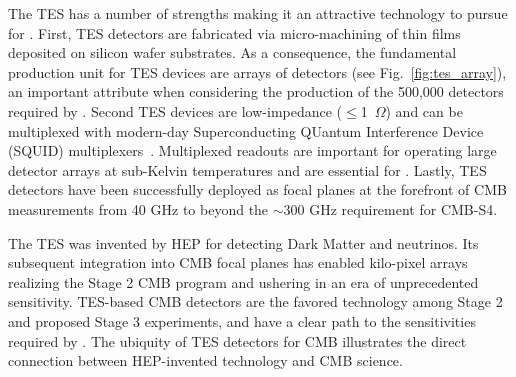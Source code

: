 The TES has a number of strengths making it an attractive technology to
pursue for \cmbexp. First, TES detectors are fabricated via
micro-machining of thin films deposited on silicon wafer
substrates. As a consequence, the fundamental production unit for TES
devices are arrays of detectors (see Fig.~\ref{fig:tes_array}), an
important attribute when considering the production of the 500,000
detectors required by \cmbexp.  Second TES devices are low-impedance
($\le$1~$\Omega$) and can be multiplexed with modern-day
Superconducting QUantum Interference Device (SQUID)
multiplexers~\cite{Lanting:2006aa,Irwin:2002aa,Irwin:2004aa}. Multiplexed readouts are important
for operating large detector arrays at sub-Kelvin temperatures and are
essential for \cmbexp. Lastly, TES detectors have been successfully
deployed as focal planes at the forefront of CMB measurements from 40 GHz
to beyond the $\sim 300$ GHz requirement for CMB-S4.



The TES was invented by HEP for detecting Dark Matter and
neutrinos. Its subsequent integration into CMB focal planes has
enabled kilo-pixel arrays realizing the Stage 2 CMB program and
ushering in an era of unprecedented sensitivity. TES-based CMB
detectors are the favored technology among Stage 2 and proposed Stage
3 experiments, and have a clear path to the sensitivities required
by \cmbexp. The ubiquity of TES detectors for CMB illustrates the
direct connection between HEP-invented technology and CMB science.


